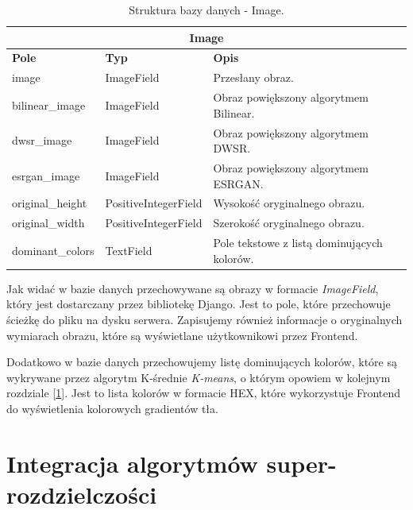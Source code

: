 \begin{table}[ht]
    \centering
    \renewcommand{\arraystretch}{1.5} %
    \begin{tabular}{|l|l|p{8cm}|}
    \hline
    \multicolumn{3}{|c|}{\textbf{Image}}                                                        \\ \hline
    \textbf{Pole}       & \textbf{Typ}          & \textbf{Opis}                                 \\ \hline
    image               & ImageField            & Przesłany obraz.                              \\ \hline
    bilinear\_image     & ImageField            & Obraz powiększony algorytmem Bilinear.        \\ \hline
    dwsr\_image         & ImageField            & Obraz powiększony algorytmem DWSR.            \\ \hline
    esrgan\_image       & ImageField            & Obraz powiększony algorytmem ESRGAN.          \\ \hline
    original\_height    & PositiveIntegerField  & Wysokość oryginalnego obrazu.                 \\ \hline
    original\_width     & PositiveIntegerField  & Szerokość oryginalnego obrazu.                \\ \hline
    dominant\_colors    & TextField             & Pole tekstowe z listą dominujących kolorów.   \\ \hline
    \end{tabular}
    \caption{Struktura bazy danych - Image.}
    \label{tab:image_model}
\end{table}

Jak widać w bazie danych przechowywane są obrazy w formacie \textit{ImageField}, który jest dostarczany przez bibliotekę Django. Jest to pole, które przechowuje ścieżkę do pliku na dysku serwera. Zapisujemy również informacje o oryginalnych wymiarach obrazu, które są wyświetlane użytkownikowi przez Frontend. 

Dodatkowo w bazie danych przechowujemy listę dominujących kolorów, które są wykrywane przez algorytm K-średnie \textit{K-means}, o którym opowiem w kolejnym rozdziale [\ref{sec:implementation-s-r}]. Jest to lista kolorów w formacie HEX, które wykorzystuje Frontend do wyświetlenia kolorowych gradientów tła.


\newpage
\section{Integracja algorytmów super-rozdzielczości} \label{sec:implementation-s-r}

